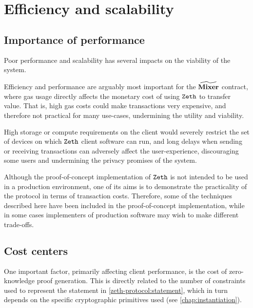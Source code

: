 
\section{Efficiency and scalability}\label{implementation:efficiency}

\newcommand{\primeF}{\ensuremath{\algostyle{prime}}\xspace}
\newcommand{\decF}{\ensuremath{\algostyle{dec}}\xspace}
\newcommand{\getsigma}{\ensuremath{\algostyle{getSigma}}\xspace}

\subsection{Importance of performance}\label{implementation:efficiency:importance-of-performance}

Poor performance and scalability has several impacts on the viability of the system.

Efficiency and performance are arguably most important for the $\widetilde{\mathbf{Mixer}}$ contract, where gas usage directly affects the monetary cost of using $\texttt{Zeth}{}$ to transfer value. That is, high gas costs could make transactions very expensive, and therefore not practical for many use-cases, undermining the utility and viability.

High storage or compute requirements on the client would severely restrict the set of devices on which $\texttt{Zeth}{}$ client software can run, and long delays when sending or receiving transactions can adversely affect the user-experience, discouraging some users and undermining the privacy promises of the system.

Although the proof-of-concept implementation of $\texttt{Zeth}{}$ is not intended to be used in a production environment, one of its aims is to demonstrate the practicality of the protocol in terms of transaction costs. Therefore, some of the techniques described here have been included in the proof-of-concept implementation, while in some cases implementers of production software may wish to make different trade-offs.

\subsection{Cost centers}\label{implementation:efficiency:cost-centers}

One important factor, primarily affecting client performance, is the cost of zero-knowledge proof generation. This is directly related to the number of constraints used to represent the statement in \cref{zeth-protocol:statement}, which in turn depends on the specific cryptographic primitives used (see \cref{chap:instantiation}).

